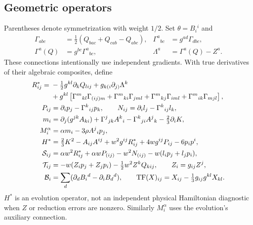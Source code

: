 \documentclass[11pt,letterpaper]{article}
\begin{document}
\subsection{Geometric operators}
Parentheses denote symmetrization with weight $1/2$. Set $\theta=B_i{}^i$ and
\begin{align}
\Gamma_{abc}&=\tfrac12(Q_{bac}+Q_{cab}-Q_{abc}),&
\Gamma^a{}_{bc}&=g^{ad}\Gamma_{dbc},\\
\Gamma^a(Q)&=g^{bc}\Gamma^a{}_{bc},&\Lambda^a&=\Gamma^a(Q)-Z^a.
\end{align}
These connections intentionally use independent gradients. With true derivatives of their algebraic composites, define
\begin{align}
R^*_{ij}={}&-\tfrac12g^{kl}\partial_k Q_{lij}+g_{k(i}\partial_{j)}\Lambda^k\nonumber\\
&+g^{kl}\left[\Gamma^m{}_{kl}\Gamma_{(ij)m}
+\Gamma^m{}_{ki}\Gamma_{jml}+\Gamma^m{}_{kj}\Gamma_{iml}
+\Gamma^m{}_{ik}\Gamma_{mjl}\right],\\
P_{ij}&=\partial_ip_j-\Gamma^k{}_{ij}p_k,\qquad
N_{ij}=\partial_il_j-\Gamma^k{}_{ij}l_k,\\
m_i&=\partial_j(g^{jk}A_{ki})+\Gamma^j{}_{jk}A^k{}_i
-\Gamma^k{}_{ji}A^j{}_k-\tfrac23\partial_iK,\\
M_i^\alpha&=\alpha m_i-3\rho A^j{}_i p_j,\\
H^*&=\tfrac23K^2-A_{ij}A^{ij}+w^2g^{ij}R^*_{ij}+4wg^{ij}P_{ij}-6p_ip^i,\\
\mathcal S_{ij}&=\alpha w^2R^*_{ij}+\alpha wP_{(ij)}-w^2N_{(ij)}
-w(l_ip_j+l_jp_i),\\
\mathcal T_{ij}&=-w(Z_ip_j+Z_jp_i)-\tfrac12w^2Z^kQ_{kij},\qquad Z_i=g_{ij}Z^j,\\
\mathcal B_i&=\sum_d(\partial_dB_i{}^d-\partial_iB_d{}^d),\qquad
\operatorname{TF}(X)_{ij}=X_{ij}-\tfrac13g_{ij}g^{kl}X_{kl}.
\end{align}
$H^*$ is an evolution operator, not an independent physical Hamiltonian diagnostic when $Z$ or reduction errors are nonzero. Similarly $M_i^\alpha$ uses the evolution's auxiliary connection.
\end{document}
